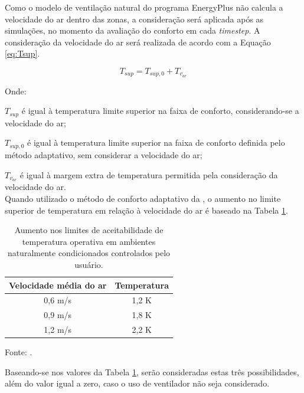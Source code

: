 \documentclass[brazil,hardcopy,openany,a5paper]{ufscthesis}
\begin{document}
		Como o modelo de ventilação natural do programa EnergyPlus não calcula a velocidade do ar dentro das zonas, a consideração será aplicada após as simulações, no momento da avaliação do conforto em cada \textit{timestep}. A consideração da velocidade do ar será realizada de acordo com a Equação \ref{eq:Tsup}.
		
		\begin{equation}
		\label{eq:Tsup}
		T_{sup} = T_{sup,0} + T_{v_{ar}}
		\end{equation}
		
		Onde:
		
		$T_{sup}$ é igual à temperatura limite superior na faixa de conforto, considerando-se a velocidade do ar;
		
		$T_{sup,0}$ é igual à temperatura limite superior na faixa de conforto definida pelo método adaptativo, sem considerar a velocidade do ar;
		
		$T_{v_{ar}}$ é igual à margem extra de temperatura permitida pela consideração da velocidade do ar.
		\\
		
		Quando utilizado o método de conforto adaptativo da  \cite{ASHRAEStandard552017}, o aumento no limite superior de temperatura em relação à velocidade do ar é baseado na Tabela \ref{table:var}.		
		
		\begin{table}[h]
			\centering
			\caption{Aumento nos limites de aceitabilidade de temperatura operativa em ambientes naturalmente condicionados controlados pelo usuário.}
			\label{table:var}
			\begin{tabular}{|c |c |}
				\hline
				\textbf{Velocidade média do ar} & \textbf{Temperatura} \\
				\hline
				0,6 m/s & 1,2 K \\
				\hline
				0,9 m/s & 1,8 K \\
				\hline
				1,2 m/s & 2,2 K \\
				\hline 
			\end{tabular}
			\begin{flushleft}
			Fonte:   \cite{ASHRAEStandard552017}.
			\end{flushleft}				
		\end{table}
	
		Baseando-se nos valores da Tabela \ref{table:var}, serão consideradas estas três possibilidades, além do valor igual a zero, caso o uso de ventilador não seja considerado.
		
\end{document}
